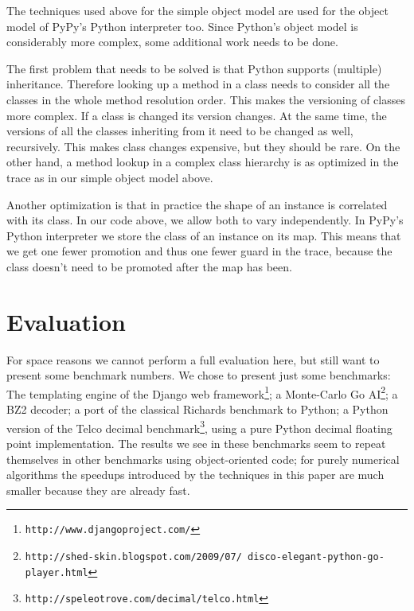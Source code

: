 \documentclass{sigplanconf}
\begin{document}
The techniques used above for the simple object model are used for the object
model of PyPy's Python interpreter too. Since Python's object model is
considerably more complex, some additional work needs to be done.

The first problem that needs to be solved is that Python supports (multiple)
inheritance. Therefore looking up a method in a class needs to consider all the
classes in the
whole method resolution order. This makes the versioning of classes more
complex. If a class is changed its version changes. At the same time, the
versions of all the classes inheriting from it need to be changed as well,
recursively. This makes class changes expensive, but they should be rare.  On the
other hand, a method lookup in a complex class hierarchy is as optimized in the
trace as in our simple object model above.

Another optimization is that in practice the shape of an instance is correlated
with its class. In our code above, we allow both to vary independently.
In PyPy's Python interpreter we store the class of an instance on its map. This
means that we get one fewer promotion and thus one fewer
guard in the trace, because the class doesn't need to be promoted after the
map has been.



%
%




\section{Evaluation}
\label{sec:evaluation}

For space reasons we cannot perform a full evaluation here, but still want to
present some benchmark numbers. We chose to present just some benchmarks: The
templating engine of the Django web
framework\footnote{\texttt{http://www.djangoproject.com/}}; a Monte-Carlo Go
AI\footnote{\texttt{http://shed-skin.blogspot.com/2009/07/
disco-elegant-python-go-player.html}}; a BZ2 decoder; a port of the classical
Richards benchmark to Python; a Python version of the Telco decimal
benchmark\footnote{\texttt{http://speleotrove.com/decimal/telco.html}}, using a
pure Python decimal floating point implementation. The results we see in these
benchmarks seem to repeat themselves in other benchmarks using object-oriented
code; for purely numerical algorithms the speedups introduced by the techniques
in this paper are much smaller because they are already fast.
\end{document}
